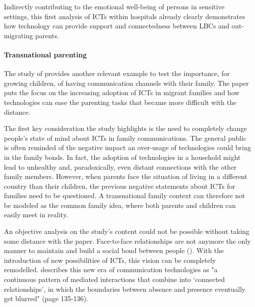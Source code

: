 Indirectly contributing to the emotional well-being of persons in sensitive settings, this first analysis of ICTs within hospitals already clearly demonstrates how technology can provide support and connectedness between LBCs and out-migrating parents. 


\paragraph{Transnational parenting}
The study of \textcite{bacigalupe2011virtualizing} provides another relevant example to test the importance, for growing children, of having communication channels with their family. The paper puts the focus on the increasing adoption of ICTs in migrant families and how technologies can ease the parenting tasks that became more difficult with the distance. 

The first key consideration the study highlights is the need to completely change people's state of mind about ICTs in family communications. The general public is often reminded of the negative impact an over-usage of technologies could bring in the family bonds. In fact, the adoption of technologies in a household might lead to unhealthy and, paradoxically, even distant connections with the other family members. However, when parents face the situation of living in a different country than their children, the previous negative statements about ICTs for families need to be questioned. A transnational family context can therefore not be modeled as the common family idea, where both parents and children can easily meet in reality.

An objective analysis on the study's content could not be possible without taking some distance with the paper. Face-to-face relationships are not anymore the only manner to maintain and build a social bond between people (\cite{bacigalupe2011virtualizing}). With the introduction of new possibilities of ICTs, this vision can be completely remodelled. \textcite{licoppe2004connected} describes this new era of communication technologies as "a continuous pattern of mediated interactions that combine into `connected relationships', in which the boundaries between absence and presence eventually get blurred" (page 135-136).

